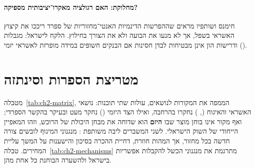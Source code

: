 \paragraph{מחלוקת: האם רגולציה מאקרו־יציבותית מספיקה?} חימנס ושותפיו \cite{jimenez2017} מראים שההפרשות הדינמיות האנטי־מחזוריות של ספרד ריככו את קיצוץ האשראי בשפל, אך לא מנעו את הבועה ולא את הצורך בחילוץ. הלקח לישראל: מגבלות  ודרישות הון אינן מבטיחות לבדן חסינות אם הבנקים חשופים במידה מופרזת לאשראי יזמי ().

\section{מטריצת הספרות וסינתזה}
\label{sec:ch2-matrix}

מטבלה~\ref{tab:ch2-matrix}, הממפה את המקורות לנושאים, עולות שתי תובנות: נושאי האשראי והאיגוח (, ) נחקרו בהרחבה, ואילו הצד היזמי () נחקר מעט ובעיקר בהקשר הספרדי; ואף מקור אינו בוחן מוצר שבו \textbf{היזם} הוא שדוחה את מבחן היכולת של הרוכש, וזהו המאפיין הייחודי של השוק הישראלי. לשני המשברים ליבה משותפת \cite{reinhart2009}: מנגנוני המינוף לובשים צורה חדשה בכל מחזור, אך המהות חוזרת, דחיית ההכרה בסיכון והישענות על המשך עליית המחירים. טבלה~\ref{tab:ch2-mechanisms} מתרגמת את מנגנוני הכשל להקבלות אפשריות בישראל ולהשערה הבוחנת כל אחת מהן.

